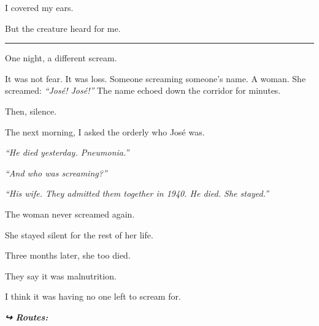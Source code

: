 \noindent I covered my ears.

\noindent But the creature heard for me.

\vspace{0.5em}\noindent\rule{\textwidth}{0.5pt}\vspace{0.5em}

\noindent One night, a different scream.

\noindent It was not fear. It was loss. Someone screaming someone's name. A woman. She screamed: \textit{\textquotedblleft{}José! José!\textquotedblright{}} The name echoed down the corridor for minutes.

\noindent Then, silence.

\noindent The next morning, I asked the orderly who José was.

\noindent \textit{\textquotedblleft{}He died yesterday. Pneumonia.\textquotedblright{}}

\noindent \textit{\textquotedblleft{}And who was screaming?\textquotedblright{}}

\noindent \textit{\textquotedblleft{}His wife. They admitted them together in 1940. He died. She stayed.\textquotedblright{}}

\noindent The woman never screamed again.

\noindent She stayed silent for the rest of her life.

\noindent Three months later, she too died.

\noindent They say it was malnutrition.

\noindent I think it was having no one left to scream for.

\vspace{0.5em}
\noindent\textit{\textbf{↪ Routes:}  \rotasep {}}
